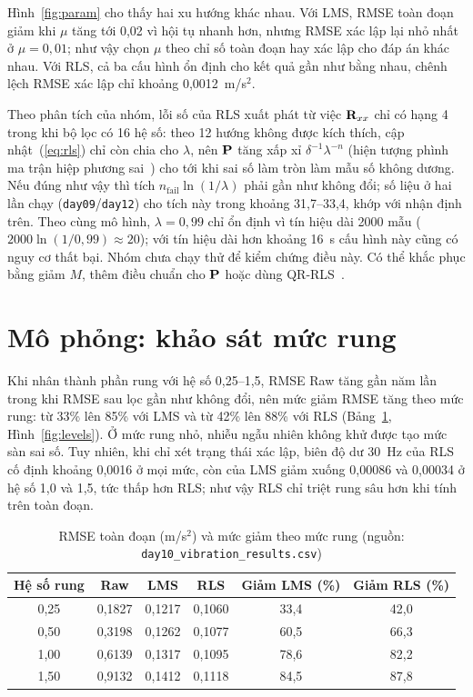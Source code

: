 \documentclass[../main.tex]{subfiles}
\begin{document}
Hình~\ref{fig:param} cho thấy hai xu hướng khác nhau. Với LMS, RMSE toàn đoạn giảm khi $\mu$ tăng tới 0,02 vì hội tụ nhanh hơn, nhưng RMSE xác lập lại nhỏ nhất ở $\mu=0{,}01$; như vậy chọn $\mu$ theo chỉ số toàn đoạn hay xác lập cho đáp án khác nhau. Với RLS, cả ba cấu hình ổn định cho kết quả gần như bằng nhau, chênh lệch RMSE xác lập chỉ khoảng 0,0012~m/s$^2$.

Theo phân tích của nhóm, lỗi số của RLS xuất phát từ việc $\mathbf{R}_{xx}$ chỉ có hạng 4 trong khi bộ lọc có 16 hệ số: theo 12 hướng không được kích thích, cập nhật~(\ref{eq:rls}) chỉ còn chia cho $\lambda$, nên $\mathbf{P}$ tăng xấp xỉ $\delta^{-1}\lambda^{-n}$ (hiện tượng phình ma trận hiệp phương sai~\cite{haykin2014adaptive}) cho tới khi sai số làm tròn làm mẫu số không dương. Nếu đúng như vậy thì tích $n_{\text{fail}}\ln(1/\lambda)$ phải gần như không đổi; số liệu ở hai lần chạy (\texttt{day09}/\texttt{day12}) cho tích này trong khoảng 31,7--33,4, khớp với nhận định trên. Theo cùng mô hình, $\lambda=0{,}99$ chỉ ổn định vì tín hiệu dài 2000 mẫu ($2000\ln(1/0{,}99)\approx20$); với tín hiệu dài hơn khoảng 16~s cấu hình này cũng có nguy cơ thất bại. Nhóm chưa chạy thử để kiểm chứng điều này. Có thể khắc phục bằng giảm $M$, thêm điều chuẩn cho $\mathbf{P}$ hoặc dùng QR-RLS~\cite{sayed2003fundamentals}.

\section{Mô phỏng: khảo sát mức rung}
\label{sec:res_level}

Khi nhân thành phần rung với hệ số 0,25--1,5, RMSE Raw tăng gần năm lần trong khi RMSE sau lọc gần như không đổi, nên mức giảm RMSE tăng theo mức rung: từ 33\% lên 85\% với LMS và từ 42\% lên 88\% với RLS (Bảng~\ref{tab:levels}, Hình~\ref{fig:levels}). Ở mức rung nhỏ, nhiễu ngẫu nhiên không khử được tạo mức sàn sai số. Tuy nhiên, khi chỉ xét trạng thái xác lập, biên độ dư 30~Hz của RLS cố định khoảng 0,0016 ở mọi mức, còn của LMS giảm xuống 0,00086 và 0,00034 ở hệ số 1,0 và 1,5, tức thấp hơn RLS; như vậy RLS chỉ triệt rung sâu hơn khi tính trên toàn đoạn.

\begin{table}[htbp]
\centering
\caption[RMSE toàn đoạn theo mức rung]{RMSE toàn đoạn (m/s$^2$) và mức giảm theo mức rung (nguồn: \texttt{day10\_vibration\_results.csv})}
\label{tab:levels}
\begin{tabular}{@{}cccccc@{}}
\toprule
\textbf{Hệ số rung} & \textbf{Raw} & \textbf{LMS} & \textbf{RLS} & \textbf{Giảm LMS (\%)} & \textbf{Giảm RLS (\%)} \\
\midrule
0,25 & 0,1827 & 0,1217 & 0,1060 & 33,4 & 42,0 \\
0,50 & 0,3198 & 0,1262 & 0,1077 & 60,5 & 66,3 \\
1,00 & 0,6139 & 0,1317 & 0,1095 & 78,6 & 82,2 \\
1,50 & 0,9132 & 0,1412 & 0,1118 & 84,5 & 87,8 \\
\bottomrule
\end{tabular}
\end{table}
\end{document}
